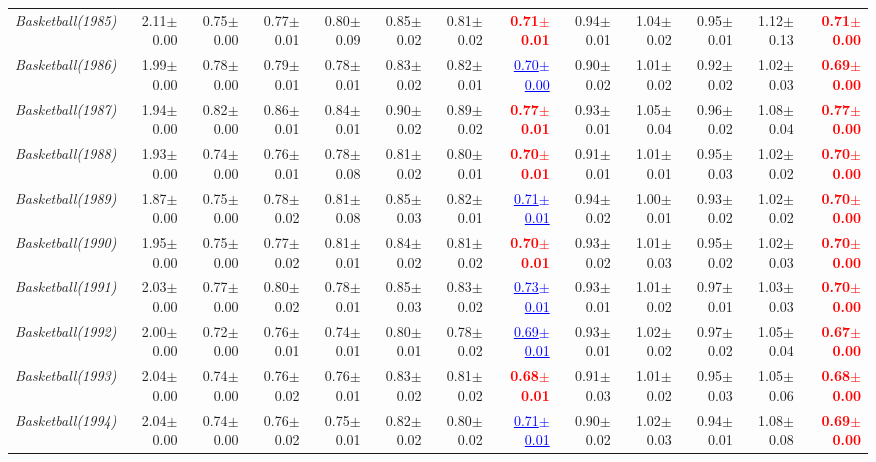 \documentclass[nohyperref]{article}
\theoremstyle{plain}
\theoremstyle{definition}
\theoremstyle{remark}
\newcommand{\red}[1]{\textcolor{red}{\textbf{#1}}}
\newcommand{\blue}[1]{\textcolor{blue}{\underline{#1}}}
\begin{document}
\begin{table*}[!ht]
{\begin{tabular}{lrr|rrrrr|rrrrr}
			{\it Basketball(1985)} & 2.11$\pm$0.00 & 0.75$\pm$0.00 & 0.77$\pm$0.01 & 0.80$\pm$0.09 & 0.85$\pm$0.02 & 0.81$\pm$0.02 & \red{0.71$\pm$0.01} & 0.94$\pm$0.01 & 1.04$\pm$0.02 & 0.95$\pm$0.01 & 1.12$\pm$0.13 & \red{0.71$\pm$0.00} \\
			{\it Basketball(1986)} & 1.99$\pm$0.00 & 0.78$\pm$0.00 & 0.79$\pm$0.01 & 0.78$\pm$0.01 & 0.83$\pm$0.02 & 0.82$\pm$0.01 & \blue{0.70$\pm$0.00} & 0.90$\pm$0.02 & 1.01$\pm$0.02 & 0.92$\pm$0.02 & 1.02$\pm$0.03 & \red{0.69$\pm$0.00} \\
			{\it Basketball(1987)} & 1.94$\pm$0.00 & 0.82$\pm$0.00 & 0.86$\pm$0.01 & 0.84$\pm$0.01 & 0.90$\pm$0.02 & 0.89$\pm$0.02 & \red{0.77$\pm$0.01} & 0.93$\pm$0.01 & 1.05$\pm$0.04 & 0.96$\pm$0.02 & 1.08$\pm$0.04 & \red{0.77$\pm$0.00} \\
			{\it Basketball(1988)} & 1.93$\pm$0.00 & 0.74$\pm$0.00 & 0.76$\pm$0.01 & 0.78$\pm$0.08 & 0.81$\pm$0.02 & 0.80$\pm$0.01 & \red{0.70$\pm$0.01} & 0.91$\pm$0.01 & 1.01$\pm$0.01 & 0.95$\pm$0.03 & 1.02$\pm$0.02 & \red{0.70$\pm$0.00} \\
			{\it Basketball(1989)} & 1.87$\pm$0.00 & 0.75$\pm$0.00 & 0.78$\pm$0.02 & 0.81$\pm$0.08 & 0.85$\pm$0.03 & 0.82$\pm$0.01 & \blue{0.71$\pm$0.01} & 0.94$\pm$0.02 & 1.00$\pm$0.01 & 0.93$\pm$0.02 & 1.02$\pm$0.02 & \red{0.70$\pm$0.00} \\
			{\it Basketball(1990)} & 1.95$\pm$0.00 & 0.75$\pm$0.00 & 0.77$\pm$0.02 & 0.81$\pm$0.01 & 0.84$\pm$0.02 & 0.81$\pm$0.02 & \red{0.70$\pm$0.01} & 0.93$\pm$0.02 & 1.01$\pm$0.03 & 0.95$\pm$0.02 & 1.02$\pm$0.03 & \red{0.70$\pm$0.00} \\
			{\it Basketball(1991)} & 2.03$\pm$0.00 & 0.77$\pm$0.00 & 0.80$\pm$0.02 & 0.78$\pm$0.01 & 0.85$\pm$0.03 & 0.83$\pm$0.02 & \blue{0.73$\pm$0.01} & 0.93$\pm$0.01 & 1.01$\pm$0.02 & 0.97$\pm$0.01 & 1.03$\pm$0.03 & \red{0.70$\pm$0.00} \\
			{\it Basketball(1992)} & 2.00$\pm$0.00 & 0.72$\pm$0.00 & 0.76$\pm$0.01 & 0.74$\pm$0.01 & 0.80$\pm$0.01 & 0.78$\pm$0.02 & \blue{0.69$\pm$0.01} & 0.93$\pm$0.01 & 1.02$\pm$0.02 & 0.97$\pm$0.02 & 1.05$\pm$0.04 & \red{0.67$\pm$0.00} \\
			{\it Basketball(1993)} & 2.04$\pm$0.00 & 0.74$\pm$0.00 & 0.76$\pm$0.02 & 0.76$\pm$0.01 & 0.83$\pm$0.02 & 0.81$\pm$0.02 & \red{0.68$\pm$0.01} & 0.91$\pm$0.03 & 1.01$\pm$0.02 & 0.95$\pm$0.03 & 1.05$\pm$0.06 & \red{0.68$\pm$0.00} \\
			{\it Basketball(1994)} & 2.04$\pm$0.00 & 0.74$\pm$0.00 & 0.76$\pm$0.02 & 0.75$\pm$0.01 & 0.82$\pm$0.02 & 0.80$\pm$0.02 & \blue{0.71$\pm$0.01} & 0.90$\pm$0.02 & 1.02$\pm$0.03 & 0.94$\pm$0.01 & 1.08$\pm$0.08 & \red{0.69$\pm$0.00} \\

\end{tabular}}
\end{table*}
\end{document}
